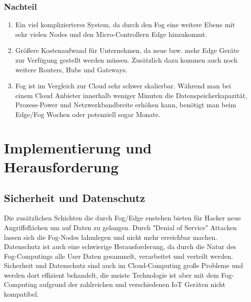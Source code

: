 \documentclass[conference]{IEEEtran}
\begin{document}
\subsubsection{Nachteil}
\begin{enumerate}
	\item Ein viel komplizierteres System, da durch den Fog eine weitere Ebene mit sehr vielen Nodes und den Micro-Controllern Edge hinzukommt.
	\item Größere Kostenaufwand für Unternehmen, da neue bzw. mehr Edge Geräte zur Verfügung gestellt werden müssen. Zusätzlich dazu kommen auch noch weitere Routers, Hubs und Gateways. 
	\item Fog ist im Vergleich zur Cloud sehr schwer skalierbar. Während man bei einem Cloud Anbieter innerhalb weniger Minuten die Datenspeicherkapazität, Prozess-Power und Netzwerkbandbreite erhöhen kann, benötigt man beim Edge/Fog Wochen oder potenziell sogar Monate. 
\end{enumerate}

\section{Implementierung und Herausforderung}

\subsection{Sicherheit und Datenschutz}
Die zusätzlichen Schichten die durch Fog/Edge enstehen bieten für Hacker neue Angriffsflächen um auf Daten zu gelangen. Durch "Denial of Service" Attacken lassen sich die Fog-Nodes lahmlegen und nicht mehr erreichbar machen. Datenschutz ist auch eine schwierige Herausforderung, da durch die Natur des Fog-Computings alle User Daten gesammelt, verarbeitet und verteilt werden. Sicherheit und Datenschutz sind auch im Cloud-Computing große Probleme und werden dort effizient behandelt, die meiste Technologie ist aber mit dem Fog-Computing aufgrund der zahlreichen und verschiedenen IoT Geräten nicht kompatibel.
\end{document}
